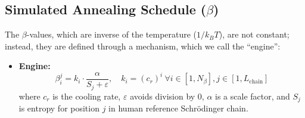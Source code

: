 \subsection{Simulated Annealing Schedule (\texorpdfstring{$\beta$}{beta})}
The $\beta$-values, which are inverse of the temperature ($1/k_B T$), are not constant; instead, they are defined through 
a mechanism, which we call the ``engine'':
\begin{itemize}
    \item \textbf{Engine:} 
    $$\displaystyle\beta_i^j = k_i \cdot \frac{\alpha}{S_j + \varepsilon}, \quad k_i = \left(c_r\right)^i\ 
    \forall i \in [1,N_\beta], j \in [1, L_\text{chain}]$$ 
    where $c_r$ is the cooling rate, $\varepsilon$ avoids division by 0, $\alpha$ is a scale factor, and $S_j$ is 
    entropy for position $j$ in human reference Schrödinger chain.
\end{itemize}

